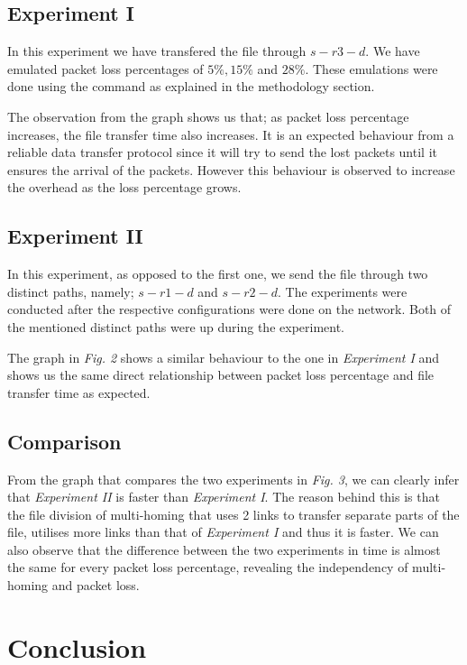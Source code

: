 \documentclass[conference]{IEEEtran}
\begin{document}
\subsection{Experiment I}
    
    In this experiment we have transfered the file through $s-r3-d$. We have emulated packet loss percentages of $5\%, 15\%$ and $28\%$. These emulations were done using the  command as explained in the methodology section. 

    The observation from the graph shows us that; as packet loss percentage increases, the file transfer time also increases. It is an expected behaviour from a reliable data transfer protocol since it will try to send the lost packets until it ensures the arrival of the packets. However this behaviour is observed to increase the overhead as the loss percentage grows.
    
    
\subsection{Experiment II}

    In this experiment, as opposed to the first one, we send the file through two distinct paths, namely; $s-r1-d$ and $s-r2-d$. The experiments were conducted after the respective configurations were done on the network. Both of the mentioned distinct paths were up during the experiment. 
    
    The graph in \textit{Fig. 2} shows a similar behaviour to the one in \textit{Experiment I} and shows us the same direct relationship between packet loss percentage and file transfer time as expected. 
    
\subsection{Comparison}
    From the graph that compares the two experiments in \textit{Fig. 3}, we can clearly infer that \textit{Experiment II} is faster than \textit{Experiment I}. The reason behind this is that the file division of multi-homing that uses 2 links to transfer separate parts of the file, utilises more links than that of \textit{Experiment I} and thus it is faster. We can also observe that the difference between the two experiments in time is almost the same for every packet loss percentage, revealing the independency of multi-homing and packet loss. 
  

\section{Conclusion}
    
\end{document}
